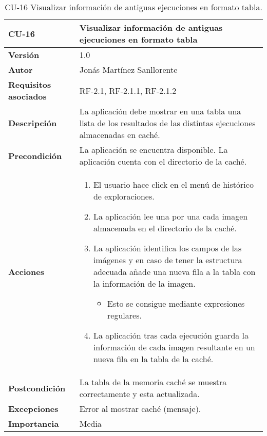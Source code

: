 \begin{table}[p]
	\centering
	\begin{tabularx}{\linewidth}{ p{} p{} }
		\toprule
		\textbf{CU-16}    & \textbf{Visualizar información de antiguas ejecuciones en formato tabla}\\
		\toprule
		\textbf{Versión}              & 1.0    \\
		\textbf{Autor}                & Jonás Martínez Sanllorente \\
		\textbf{Requisitos asociados} & RF-2.1, RF-2.1.1, RF-2.1.2 \\
		\textbf{Descripción}          & La aplicación debe mostrar en una tabla una lista de los resultados de las distintas ejecuciones almacenadas en caché. \\
		\textbf{Precondición}         & La aplicación se encuentra disponible.\newline
                                        La aplicación cuenta con el directorio de la caché.\\
		\textbf{Acciones}             &
		\begin{enumerate}
			\def\labelenumi{\arabic{enumi}.}
			\tightlist
            \item El usuario hace click en el menú de histórico de exploraciones.
			\item La aplicación lee una por una cada imagen almacenada en el directorio de la caché.
            \item La aplicación identifica los campos de las imágenes y en caso de tener la estructura adecuada añade una nueva fila a la tabla con la información de la imagen.
            \begin{itemize}
                \item Esto se consigue mediante expresiones regulares.
            \end{itemize}
            \item La aplicación tras cada ejecución guarda la información de cada imagen resultante en un nueva fila en la tabla de la caché.
		\end{enumerate}\\
		\textbf{Postcondición}        & La tabla de la memoria caché se muestra correctamente y esta actualizada. \\
		\textbf{Excepciones}          & Error al mostrar caché (mensaje). \\
		\textbf{Importancia}          & Media \\
		\bottomrule
	\end{tabularx}
	\caption{CU-16 Visualizar información de antiguas ejecuciones en formato tabla.}
\end{table}

